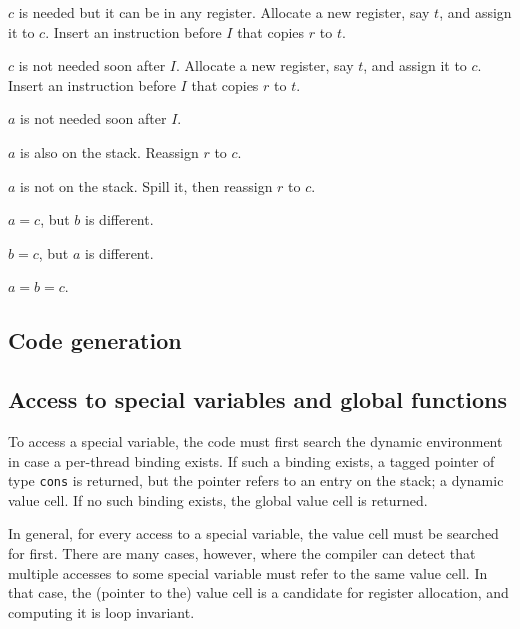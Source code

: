 \begin{legal}
\begin{legal}
\begin{legal}
\begin{legal}
\begin{legal}
\begin{legal}
\begin{legal}
\begin{legal}
\begin{legal}
                \end{legal}
              \end{legal}
            \end{legal}
          \end{legal}
        \item $c$ is needed but it can be in any register.  Allocate
          a new register, say $t$, and assign it to $c$.  Insert an
          instruction before $I$ that copies $r$ to $t$.
        \end{legal}
      \item $c$ is not needed soon after $I$.  Allocate a new
        register, say $t$, and assign it to $c$.  Insert an
        instruction before $I$ that copies $r$ to $t$.
      \end{legal}
    \item $a$ is not needed soon after $I$.
      \begin{legal}
      \item $a$ is also on the stack.  Reassign $r$ to $c$.
      \item $a$ is not on the stack.  Spill it, then reassign $r$ to
        $c$.
      \end{legal}
    \end{legal}
  \end{legal}
\item $a = c$, but $b$ is different.
\item $b = c$, but $a$ is different.
\item $a = b = c$.
\end{legal}

\subsection{Code generation}

\subsection{Access to special variables and global functions}

To access a special variable, the code must first search the dynamic
environment in case a per-thread binding exists.  If such a binding
exists, a tagged pointer of type \texttt{cons} is returned, but the
pointer refers to an entry on the stack; a dynamic value cell.  If no
such binding exists, the global value cell is returned.

In general, for every access to a special variable, the value cell
must be searched for first.  There are many cases, however, where the
compiler can detect that multiple accesses to some special variable
must refer to the same value cell.  In that case, the (pointer to the)
value cell is a candidate for register allocation, and computing it is
loop invariant.

